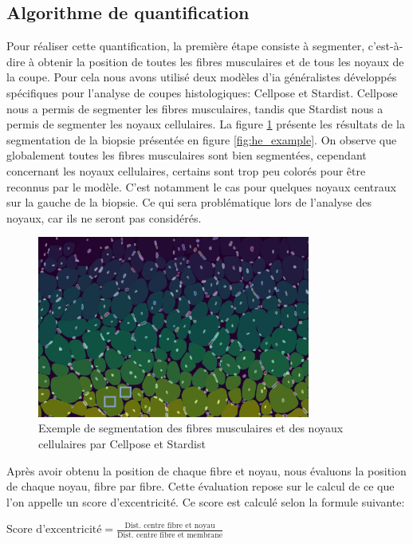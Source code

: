 \subsection{Algorithme de quantification}
Pour réaliser cette quantification, la première étape consiste à segmenter, c'est-à-dire à obtenir la position de toutes les fibres musculaires et de tous les noyaux de la coupe. Pour cela nous avons utilisé deux modèles d'\gls{ia} généralistes développés spécifiques pour l'analyse de coupes histologiques: Cellpose et Stardist. Cellpose nous a permis de segmenter les fibres musculaires, tandis que Stardist nous a permis de segmenter les noyaux cellulaires. La figure \ref{fig:he_seg} présente les résultats de la segmentation de la biopsie présentée en figure \ref{fig:he_example}. On observe que globalement toutes les fibres musculaires sont bien segmentées, cependant concernant les noyaux cellulaires, certains sont trop peu colorés pour être reconnus par le modèle. C'est notamment le cas pour quelques noyaux centraux sur la gauche de la biopsie. Ce qui sera problématique lors de l'analyse des noyaux, car ils ne seront pas considérés.
\begin{figure}[!ht]
 \centering
 \includegraphics[width=0.8\textwidth]{figures/he_seg.png}
 \caption[Exemple de segmentation de biopsie par Cellpose et Stardist]{Exemple de segmentation des fibres musculaires et des noyaux cellulaires par Cellpose et Stardist}
 \label{fig:he_seg}
\end{figure}

Après avoir obtenu la position de chaque fibre et noyau, nous évaluons la position de chaque noyau, fibre par fibre. Cette évaluation repose sur le calcul de ce que l'on appelle un score d'excentricité. Ce score est calculé selon la formule suivante:

\(\text{Score d'excentricité} = \frac{\text{Dist. centre fibre et noyau}}{\text{Dist. centre fibre et membrane}}\)


